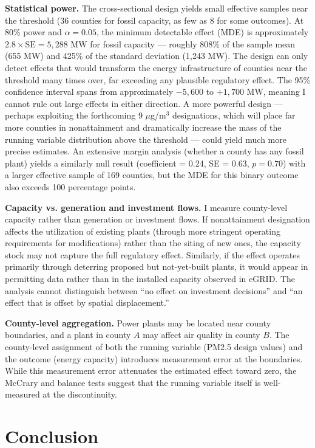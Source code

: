 \documentclass[12pt]{article}
\begin{document}
\textbf{Statistical power.} The cross-sectional design yields small effective samples near the threshold (36 counties for fossil capacity, as few as 8 for some outcomes). At 80\% power and $\alpha = 0.05$, the minimum detectable effect (MDE) is approximately $2.8 \times \text{SE} = 5{,}288$ MW for fossil capacity --- roughly 808\% of the sample mean (655 MW) and 425\% of the standard deviation (1,243 MW). The design can only detect effects that would transform the energy infrastructure of counties near the threshold many times over, far exceeding any plausible regulatory effect. The 95\% confidence interval spans from approximately $-5{,}600$ to $+1{,}700$ MW, meaning I cannot rule out large effects in either direction. A more powerful design --- perhaps exploiting the forthcoming 9 $\mu$g/m$^3$ designations, which will place far more counties in nonattainment and dramatically increase the mass of the running variable distribution above the threshold --- could yield much more precise estimates. An extensive margin analysis (whether a county has any fossil plant) yields a similarly null result (coefficient = 0.24, SE = 0.63, $p = 0.70$) with a larger effective sample of 169 counties, but the MDE for this binary outcome also exceeds 100 percentage points.

\textbf{Capacity vs. generation and investment flows.} I measure county-level capacity rather than generation or investment flows. If nonattainment designation affects the utilization of existing plants (through more stringent operating requirements for modifications) rather than the siting of new ones, the capacity stock may not capture the full regulatory effect. Similarly, if the effect operates primarily through deterring proposed but not-yet-built plants, it would appear in permitting data rather than in the installed capacity observed in eGRID. The analysis cannot distinguish between ``no effect on investment decisions'' and ``an effect that is offset by spatial displacement.''

\textbf{County-level aggregation.} Power plants may be located near county boundaries, and a plant in county $A$ may affect air quality in county $B$. The county-level assignment of both the running variable (PM2.5 design values) and the outcome (energy capacity) introduces measurement error at the boundaries. While this measurement error attenuates the estimated effect toward zero, the McCrary and balance tests suggest that the running variable itself is well-measured at the discontinuity.


\section{Conclusion}
\label{sec:conclusion}
\end{document}
